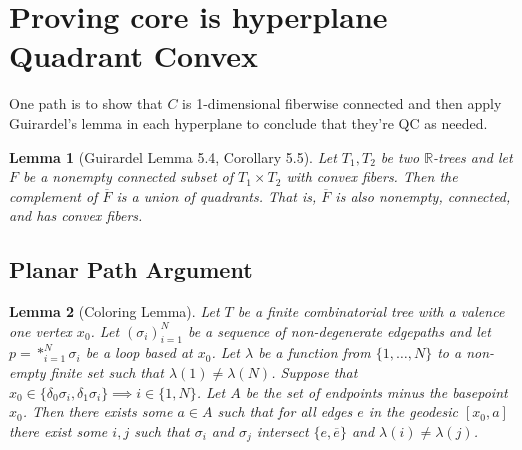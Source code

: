 \documentclass{article}
\theoremstyle{mystyle}
\newtheorem{lem}{Lemma}[section]
\theoremstyle{remark}
\begin{document}
\section{Proving core is hyperplane Quadrant Convex}
One path is to show that \(C\) is 1-dimensional fiberwise connected and then apply Guirardel's lemma in each hyperplane to conclude that they're QC as needed.

\begin{lem}
	[Guirardel Lemma 5.4, Corollary 5.5]
	Let \(T_{1} , T_{2}\) be two \(\mathbb{R}\)-trees and let \(F\) be a nonempty connected subset of \(T_{1} \times T_{2}\) with convex fibers. Then the complement of \(\overline{F}\) is a union of quadrants. That is, \(\overline{F}\) is also nonempty, connected, and has convex fibers.
\end{lem}
\subsection{Planar Path Argument}
\begin{lem}[Coloring Lemma]%
	Let \(T\) be a finite combinatorial tree with a valence one vertex \(x_{0}\). Let \((\sigma_{i} )_{i=1}^{N}\) be a sequence of non-degenerate edgepaths and let \(p = *_{i=1}^{N} \sigma_{i}\) be a loop based at \(x_{0}\). Let \(\lambda\) be a function from \(\{1,\ldots,N\}\) to a non-empty finite set such that \(\lambda (1) \neq \lambda (N)\). Suppose that \(x_{0} \in \{\delta_{0} \sigma_{i} , \delta_{1} \sigma_{i} \} \implies i \in \{1,N\}\). Let \(A\) be the set of endpoints minus the basepoint \(x_{ 0}\). Then there exists some \(a \in A\) such that for all edges \(e\) in the geodesic \([x_{0} , a]\) there exist some \(i, j\) such that \(\sigma_{i}\) and \(\sigma_{j}\) intersect \(\{e,\overline{e}\}\) and \(\lambda ( i ) \neq \lambda ( j )\).
\end{lem}%
\end{document}

